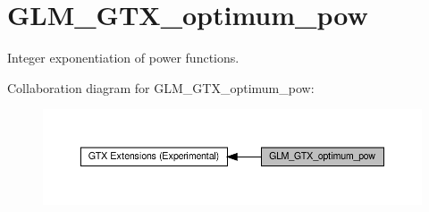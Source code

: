\hypertarget{group__gtx__optimum__pow}{}\section{G\+L\+M\+\_\+\+G\+T\+X\+\_\+optimum\+\_\+pow}
\label{group__gtx__optimum__pow}


Integer exponentiation of power functions.  


Collaboration diagram for G\+L\+M\+\_\+\+G\+T\+X\+\_\+optimum\+\_\+pow\+:\nopagebreak
\begin{figure}[H]
\begin{center}
\leavevmode
\includegraphics[width=350pt]{group__gtx__optimum__pow}
\end{center}
\end{figure}
